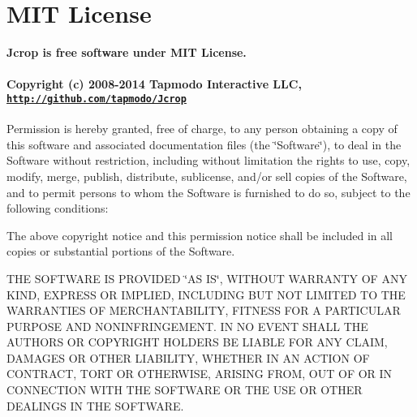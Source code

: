\section*{M\+IT License }

{\bfseries Jcrop is free software under M\+IT License.}

\paragraph*{Copyright (c) 2008-\/2014 Tapmodo Interactive L\+LC,~\newline
\href{http://github.com/tapmodo/Jcrop}{\tt http\+://github.\+com/tapmodo/\+Jcrop}}

Permission is hereby granted, free of charge, to any person obtaining a copy of this software and associated documentation files (the \char`\"{}\+Software\char`\"{}), to deal in the Software without restriction, including without limitation the rights to use, copy, modify, merge, publish, distribute, sublicense, and/or sell copies of the Software, and to permit persons to whom the Software is furnished to do so, subject to the following conditions\+:

The above copyright notice and this permission notice shall be included in all copies or substantial portions of the Software.

T\+HE S\+O\+F\+T\+W\+A\+RE IS P\+R\+O\+V\+I\+D\+ED \char`\"{}\+A\+S I\+S\char`\"{}, W\+I\+T\+H\+O\+UT W\+A\+R\+R\+A\+N\+TY OF A\+NY K\+I\+ND, E\+X\+P\+R\+E\+SS OR I\+M\+P\+L\+I\+ED, I\+N\+C\+L\+U\+D\+I\+NG B\+UT N\+OT L\+I\+M\+I\+T\+ED TO T\+HE W\+A\+R\+R\+A\+N\+T\+I\+ES OF M\+E\+R\+C\+H\+A\+N\+T\+A\+B\+I\+L\+I\+TY, F\+I\+T\+N\+E\+SS F\+OR A P\+A\+R\+T\+I\+C\+U\+L\+AR P\+U\+R\+P\+O\+SE A\+ND N\+O\+N\+I\+N\+F\+R\+I\+N\+G\+E\+M\+E\+NT. IN NO E\+V\+E\+NT S\+H\+A\+LL T\+HE A\+U\+T\+H\+O\+RS OR C\+O\+P\+Y\+R\+I\+G\+HT H\+O\+L\+D\+E\+RS BE L\+I\+A\+B\+LE F\+OR A\+NY C\+L\+A\+IM, D\+A\+M\+A\+G\+ES OR O\+T\+H\+ER L\+I\+A\+B\+I\+L\+I\+TY, W\+H\+E\+T\+H\+ER IN AN A\+C\+T\+I\+ON OF C\+O\+N\+T\+R\+A\+CT, T\+O\+RT OR O\+T\+H\+E\+R\+W\+I\+SE, A\+R\+I\+S\+I\+NG F\+R\+OM, O\+UT OF OR IN C\+O\+N\+N\+E\+C\+T\+I\+ON W\+I\+TH T\+HE S\+O\+F\+T\+W\+A\+RE OR T\+HE U\+SE OR O\+T\+H\+ER D\+E\+A\+L\+I\+N\+GS IN T\+HE S\+O\+F\+T\+W\+A\+RE. 